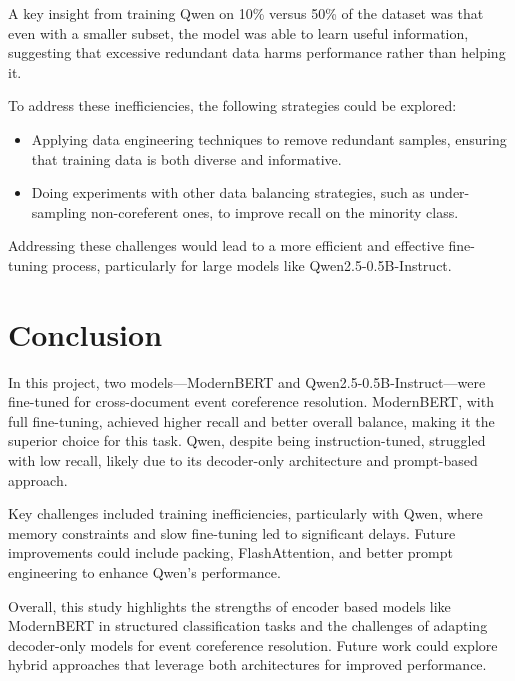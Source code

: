 \documentclass[12pt,a4paper]{article}
\begin{document}
A key insight from training Qwen on 10\% versus 50\% of the dataset was that even with a smaller subset, the model was able to learn useful information, suggesting that excessive redundant data harms performance rather than helping it.

To address these inefficiencies, the following strategies could be explored:

\begin{itemize}
    \item Applying data engineering techniques to remove redundant samples, ensuring that training data is both diverse and informative.
    \item Doing experiments with other data balancing strategies, such as under-sampling non-coreferent ones, to improve recall on the minority class.
\end{itemize}

Addressing these challenges would lead to a more efficient and effective fine-tuning process, particularly for large models like Qwen2.5-0.5B-Instruct.

\section{Conclusion}

In this project, two models—ModernBERT and Qwen2.5-0.5B-Instruct—were fine-tuned for cross-document event coreference resolution. ModernBERT, with full fine-tuning, achieved higher recall and better overall balance, making it the superior choice for this task. Qwen, despite being instruction-tuned, struggled with low recall, likely due to its decoder-only architecture and prompt-based approach.

Key challenges included training inefficiencies, particularly with Qwen, where memory constraints and slow fine-tuning led to significant delays. Future improvements could include packing, FlashAttention, and better prompt engineering to enhance Qwen’s performance.

Overall, this study highlights the strengths of encoder based models like ModernBERT in structured classification tasks and the challenges of adapting decoder-only models for event coreference resolution. Future work could explore hybrid approaches that leverage both architectures for improved performance.
\end{document}
